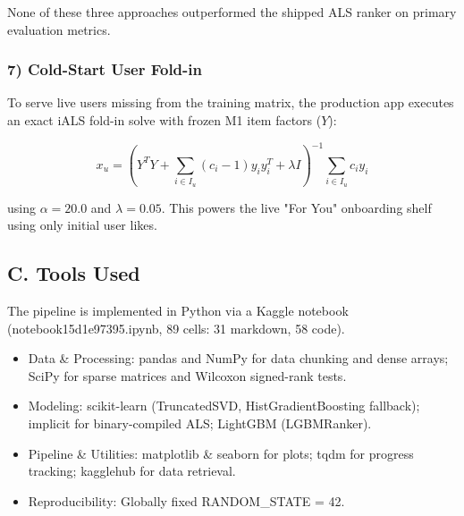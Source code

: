 \documentclass[conference]{IEEEtran}
\begin{document}
None of these three approaches outperformed the shipped ALS ranker on primary evaluation metrics.

\subsubsection*{7) Cold-Start User Fold-in}

To serve live users missing from the training matrix, the production app executes an exact iALS fold-in solve with frozen M1 item factors ($Y$):

\begin{equation}
x_u = \left( Y^T Y + \sum_{i \in I_u} (c_i - 1) y_i y_i^T + \lambda I \right)^{-1} \sum_{i \in I_u} c_i y_i
\end{equation}

using $\alpha = 20.0$ and $\lambda = 0.05$. This powers the live "For You" onboarding shelf using only initial user likes.

\subsection*{C. Tools Used}

The pipeline is implemented in Python via a Kaggle notebook (notebook15d1e97395.ipynb, 89 cells: 31 markdown, 58 code).

\begin{itemize}

\item Data \& Processing: pandas and NumPy for data chunking and dense arrays; SciPy for sparse matrices and Wilcoxon signed-rank tests.

\end{itemize}

\begin{itemize}

\item Modeling: scikit-learn (TruncatedSVD, HistGradientBoosting fallback); implicit for binary-compiled ALS; LightGBM (LGBMRanker).

\end{itemize}

\begin{itemize}

\item Pipeline \& Utilities: matplotlib \& seaborn for plots; tqdm for progress tracking; kagglehub for data retrieval.

\end{itemize}

\begin{itemize}

\item Reproducibility: Globally fixed RANDOM\_STATE = 42.

\end{itemize}
\end{document}
